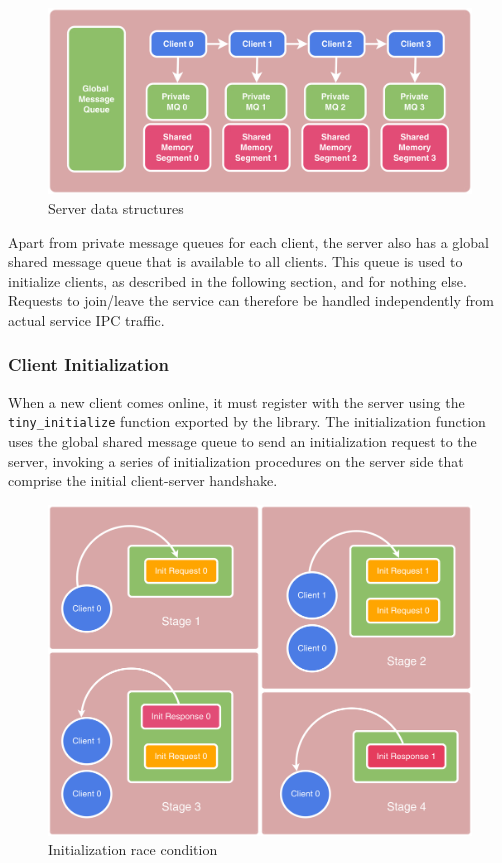 \documentclass[paper=a4,fontsize=11pt]{report} %
\numberwithin{equation}{section} %
\numberwithin{figure}{section} %
\numberwithin{table}{section} %
\begin{document}
\begin{figure}[b!]
  \includegraphics[width=\linewidth]{img/ll.png}
  \caption{Server data structures}
\end{figure}

Apart from private message queues for each client, the server also has a global shared message queue that is available to all clients. This queue is used to initialize clients, as described in the following section, and for nothing else. Requests to join/leave the service can therefore be handled independently from actual service IPC traffic.

\subsubsection{Client Initialization}
When a new client comes online, it must register with the server using the \texttt{tiny\_initialize} function exported by the library. The initialization function uses the global shared message queue to send an initialization request to the server, invoking a series of initialization procedures on the server side that comprise the initial client-server handshake.

\begin{figure}[b!]
  \includegraphics[width=\linewidth]{img/init.png}
  \caption{Initialization race condition}
\end{figure}
\end{document}
